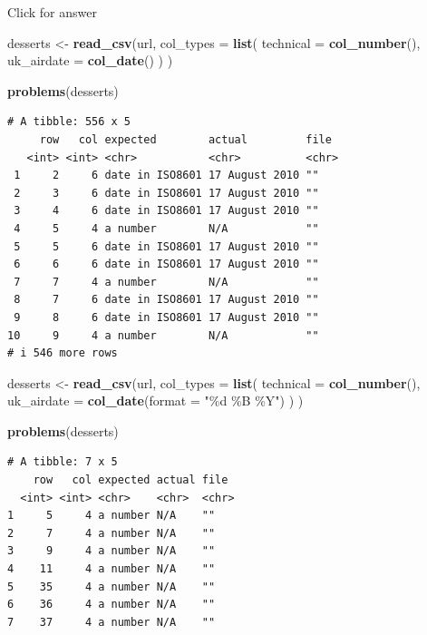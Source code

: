 \documentclass[
]{book}
\newenvironment{Shaded}{\begin{snugshade}}{\end{snugshade}}
\newcommand{\AttributeTok}[1]{\textcolor[rgb]{0.13,0.29,0.53}{#1}}
\newcommand{\FunctionTok}[1]{\textcolor[rgb]{0.13,0.29,0.53}{\textbf{#1}}}
\newcommand{\NormalTok}[1]{#1}
\newcommand{\OtherTok}[1]{\textcolor[rgb]{0.56,0.35,0.01}{#1}}
\newcommand{\StringTok}[1]{\textcolor[rgb]{0.31,0.60,0.02}{#1}}
\begin{document}
Click for answer

\begin{Shaded}
\begin{Highlighting}[]
\NormalTok{desserts }\OtherTok{\textless{}{-}} \FunctionTok{read\_csv}\NormalTok{(url,}
  \AttributeTok{col\_types =} \FunctionTok{list}\NormalTok{(}
    \AttributeTok{technical =} \FunctionTok{col\_number}\NormalTok{(),}
    \AttributeTok{uk\_airdate =} \FunctionTok{col\_date}\NormalTok{()}
\NormalTok{  )}
\NormalTok{)}

\FunctionTok{problems}\NormalTok{(desserts)}
\end{Highlighting}
\end{Shaded}

\begin{verbatim}
# A tibble: 556 x 5
     row   col expected        actual         file 
   <int> <int> <chr>           <chr>          <chr>
 1     2     6 date in ISO8601 17 August 2010 ""   
 2     3     6 date in ISO8601 17 August 2010 ""   
 3     4     6 date in ISO8601 17 August 2010 ""   
 4     5     4 a number        N/A            ""   
 5     5     6 date in ISO8601 17 August 2010 ""   
 6     6     6 date in ISO8601 17 August 2010 ""   
 7     7     4 a number        N/A            ""   
 8     7     6 date in ISO8601 17 August 2010 ""   
 9     8     6 date in ISO8601 17 August 2010 ""   
10     9     4 a number        N/A            ""   
# i 546 more rows
\end{verbatim}

\begin{Shaded}
\begin{Highlighting}[]
\NormalTok{desserts }\OtherTok{\textless{}{-}} \FunctionTok{read\_csv}\NormalTok{(url,}
    \AttributeTok{col\_types =} \FunctionTok{list}\NormalTok{(}
    \AttributeTok{technical =} \FunctionTok{col\_number}\NormalTok{(), }
    \AttributeTok{uk\_airdate =} \FunctionTok{col\_date}\NormalTok{(}\AttributeTok{format =} \StringTok{"\%d \%B \%Y"}\NormalTok{)}
\NormalTok{  ) }
\NormalTok{)}

\FunctionTok{problems}\NormalTok{(desserts)}
\end{Highlighting}
\end{Shaded}

\begin{verbatim}
# A tibble: 7 x 5
    row   col expected actual file 
  <int> <int> <chr>    <chr>  <chr>
1     5     4 a number N/A    ""   
2     7     4 a number N/A    ""   
3     9     4 a number N/A    ""   
4    11     4 a number N/A    ""   
5    35     4 a number N/A    ""   
6    36     4 a number N/A    ""   
7    37     4 a number N/A    ""   
\end{verbatim}
\end{document}
